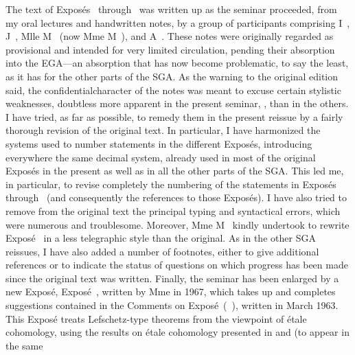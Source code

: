 The text of Expos\'es~ through~ was written up as the
seminar proceeded, from my oral lectures and handwritten notes, by a group
of participants comprising I\ptbl~,
J\ptbl~, Mlle M\ptbl~ (now
Mme M\ptbl~), and A\ptbl~.
These notes were originally regarded as provisional and intended for very
limited circulation, pending their absorption into the EGA---an absorption
that has now become problematic, to say the least, as it has for the other
parts of the SGA. As the warning to the original edition said, the
\og confidential\fg character of the notes was meant to excuse certain
\og stylistic weaknesses\fg, doubtless more apparent in the present
seminar, , than in the others. I have tried, as far as possible, to
remedy them in the present reissue by a fairly thorough revision of the
original text. In particular, I have harmonized the systems used to number
statements in the different Expos\'es, introducing everywhere the same
decimal system, already used in most of the original Expos\'es in the
present  as well as in all the other parts of the SGA. This led me,
in particular, to revise completely the numbering of
the statements in Expos\'es~ through~\pageoriginale
(and consequently the references to those Expos\'es). I have also tried to remove from the original text the principal
typing and syntactical errors, which were numerous and troublesome.
Moreover, Mme M\ptbl~ kindly undertook to rewrite
Expos\'e~ in a less telegraphic style than the original. As in the
other SGA reissues, I have also added a number of footnotes, either to give
additional references or to indicate the status of questions on which
progress has been made since the original text was written. Finally, the
seminar has been enlarged by a new Expos\'e, 
Expos\'e~, written by Mme
 in 1967, which takes up and
completes suggestions contained in the \og Comments on
Expos\'e~\fg (~), written in March 1963.
This Expos\'e treats Lefschetz-type theorems from the viewpoint of \'etale
cohomology, using the results on \'etale cohomology presented in 
and  (to appear in the same
